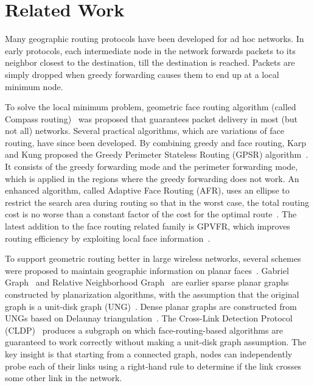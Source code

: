 \documentclass[3p,times]{elsarticle}
\begin{document}
\section{Related Work}
\label{related}


Many geographic routing protocols have been developed for ad hoc networks.
In early protocols,
each intermediate node in the network forwards packets to its neighbor closest to
the destination, till the destination is
reached.
Packets are simply dropped when greedy
forwarding causes them to end up at a local minimum node.

To solve the local minimum problem, geometric face routing algorithm
(called Compass routing)~\cite{ex16} was proposed that guarantees packet delivery
in most (but not all) networks.
Several practical algorithms, which are variations of face routing,  have since been developed.
By combining greedy and face routing, Karp and Kung proposed the Greedy Perimeter Stateless Routing
(GPSR) algorithm~\cite{ex13}.
It consists of the greedy forwarding mode and the perimeter forwarding mode,
which is applied in the regions where the greedy forwarding does not work.
An enhanced algorithm, called Adaptive Face
Routing (AFR), uses an ellipse to restrict the search area
during routing so that in the worst case,
the total routing cost is no worse than a constant factor of the cost for the optimal route~\cite{ex17}.
The latest addition to the face routing related family is GPVFR,
which improves routing efficiency by exploiting local
face information~\cite{ex18}.


To support geometric routing better in large wireless networks,
several schemes were proposed to maintain geographic information on planar faces~\cite{ex19}.
Gabriel Graph~\cite{gg} and Relative Neighborhood Graph~\cite{rng} are earlier sparse planar graphs
constructed by planarization algorithms,
with the assumption that the original graph is a unit-disk graph (UNG)~\cite{udg}.
Dense planar graphs are constructed from UNGs based on Delaunay triangulation~\cite{PLDel}.
The Cross-Link Detection Protocol (CLDP)~\cite{ex19} produces a subgraph on which face-routing-based algorithms
are guaranteed to work correctly without making a unit-disk graph assumption.
The key insight is that starting from a connected graph, nodes can
independently probe each of their links using a right-hand rule to determine
if the link crosses some other link in the network.
\end{document}
